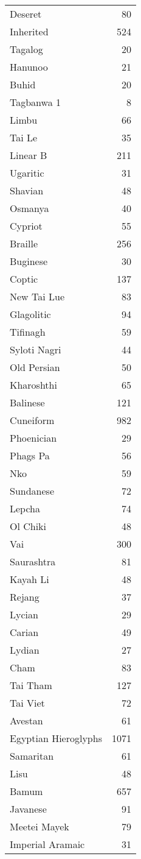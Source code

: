 \begin{longtable}{lr}
Deseret	&80\\
Inherited	&524\\
Tagalog	&20\\
Hanunoo	&21\\
Buhid	&20\\
Tagbanwa	1&8\\
Limbu	&66\\
Tai Le	 &35\\
Linear B	&211\\
Ugaritic	&31\\
Shavian	&48\\
Osmanya	&40\\
Cypriot	&55\\
Braille	&256\\
Buginese	&30\\
Coptic	 &137\\
New Tai Lue	&83\\
Glagolitic	&94\\
Tifinagh	&59\\
Syloti Nagri	&44\\
Old Persian	&50\\
Kharoshthi	&65\\
Balinese	&121\\
Cuneiform	&982\\
Phoenician	&29\\
Phags Pa	&56\\
Nko	 &59\\
Sundanese	&72\\
Lepcha	 &74\\
Ol Chiki	&48\\
Vai	&300\\
Saurashtra	&81\\
Kayah Li	&48\\
Rejang	 &37\\
Lycian	 &29\\
Carian	 &49\\
Lydian	 &27\\
Cham	 &83\\
Tai Tham	&127\\
Tai Viet	&72\\
Avestan	&61\\
Egyptian Hieroglyphs	&1071\\
Samaritan	 &61\\
Lisu	&48\\
Bamum	&657\\
Javanese	&91\\
Meetei Mayek	&79\\
Imperial Aramaic	&31\\

\end{longtable}
